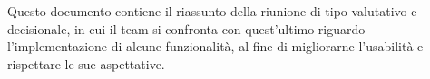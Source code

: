 Questo documento contiene il riassunto della riunione di tipo valutativo e decisionale, in cui il team si confronta con quest'ultimo riguardo l'implementazione di alcune funzionalità, al fine di migliorarne l'usabilità e rispettare le sue aspettative.
